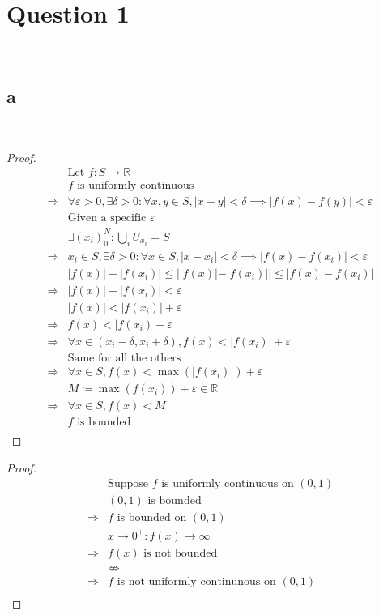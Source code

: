 \documentclass{article}
\begin{document}
\section*{Question 1}

~

\subsection*{a}

~

\begin{proof}
    \begin{align*}
        &\text{Let }f:S\to\mathbb{R}\\
        &f\text{ is uniformly continuous}\\
        \Rightarrow&\forall \varepsilon>0,\exists\delta>0:\forall x,y\in S,|x-y|<\delta\implies |f(x)-f(y)|<\varepsilon\\
        &\text{Given a specific }\varepsilon\\
        &\exists (x_i)_0^N:\bigcup_{i}U_{x_i}=S\\
        \Rightarrow&x_i\in S,\exists \delta>0:\forall x\in S,|x-x_i|<\delta\implies |f(x)-f(x_i)|<\varepsilon\\
        &|f(x)|-|f(x_i)|\leqslant||f(x)|-|f(x_i)||\leqslant|f(x)-f(x_i)|\\
        \Rightarrow&|f(x)|-|f(x_i)|<\varepsilon\\
        &|f(x)|<|f(x_i)|+\varepsilon\\
        \Rightarrow&f(x)<|f(x_i)+\varepsilon\\
        \Rightarrow&\forall x\in(x_i-\delta,x_i+\delta),f(x)<|f(x_i)|+\varepsilon\\
        &\text{Same for all the others}\\
        \Rightarrow&\forall x\in S, f(x)<\max(|f(x_i)|)+\varepsilon\\
        &M\coloneqq\max(f(x_i))+\varepsilon\in\mathbb{R}\\
        \Rightarrow&\forall x\in S, f(x)<M\\
        &f\text{ is bounded}\\
    \end{align*}
\end{proof}

\begin{proof}
    \begin{align*}
        &\text{Suppose }f\text{ is uniformly continuous on }(0,1)\\
        &(0,1)\text{ is bounded}\\
        \Rightarrow&f\text{ is bounded on }(0,1)\\
        &x\to0^+:f(x)\to\infty\\
        \Rightarrow&f(x)\text{ is not bounded}\\
        &\nLeftrightarrow\\
        \Rightarrow&f\text{ is not uniformly continunous on }(0,1)\\
    \end{align*}
\end{proof}
\end{document}
